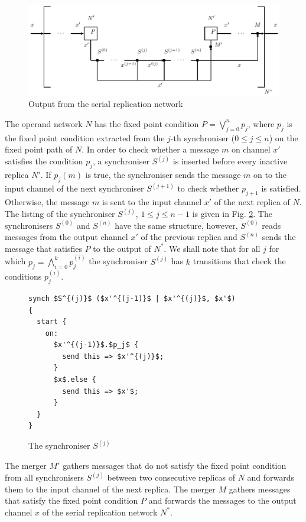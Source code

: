 \begin{figure}[h!]
\centering
\includegraphics[scale=0.8]{figs/chapter_04_ffp_out.pdf}
\caption{Output from the serial replication network}
\label{fig:ffp_out}
\end{figure}

The operand network $N$ has the fixed point condition $P = \bigvee_{j=0}^{n} p_j$, where $p_j$ is the fixed point condition extracted from the $j$-th synchroniser ($0 \leq j \leq n$) on the fixed point path of $N$. In order to check whether a message $m$ on channel $x'$ satisfies the condition $p_j$, a synchroniser $S^{(j)}$ is inserted before every inactive replica $N'$. If $p_{j}(m)$ is true, the synchroniser sends the message $m$ on to the input channel of the next synchroniser $S^{(j+1)}$ to check whether $p_{j+1}$ is satisfied. Otherwise, the message $m$ is sent to the input channel $x'$ of the next replica of $N$. The listing of the synchroniser $S^{(j)}$, $1 \leq j \leq n-1$ is given in Fig. \ref{ffp:synch_filt}. The synchronisers $S^{(0)}$ and $S^{(n)}$ have the same structure, however, $S^{(0)}$ reads messages from the output channel $x'$ of the previous replica and $S^{(n)}$ sends the message that satisfies $P$ to the output of $N^{*}$. We shall note that for all $j$ for which $p_j = \bigwedge_{i=0}^{k}p^{(i)}_j$ the synchroniser $S^{(j)}$ has $k$ transitions that check the conditions $p^{(i)}_j$.
\begin{figure}[h!]
\begin{lstlisting}[frame=single,mathescape]
synch $S^{(j)}$ ($x'^{(j-1)}$ | $x'^{(j)}$, $x'$)
{
  start {
    on:
      $x'^{(j-1)}$.$p_j$ {
        send this => $x'^{(j)}$;
      }
      $x$.else {
        send this => $x'$;
      }
  }
}
\end{lstlisting}
\caption{The synchroniser $S^{(j)}$}
\label{ffp:synch_filt}
\end{figure}

The merger $M'$ gathers messages that do not satisfy the fixed point condition from all synchronisers $S^{(j)}$ between two consecutive replicas of $N$ and forwards them to the input channel of the next replica. The merger $M$ gathers messages that satisfy the fixed point condition $P$ and forwards the messages to the output channel $x$ of the serial replication network $N^{*}$.

